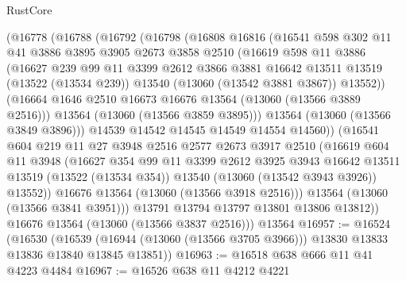 \begin{lexlean}{RustCore}
\begin{coremodule}
        (@16778
          (@16788
            (@16792
              (@16798
                (@16808
                  @16816
                  (@16541
                    @598
                    @302
                    @11
                    @41
                    @3886
                    @3895
                    @3905
                    @2673
                    @3858
                    @2510
                    (@16619
                      @598
                      @11
                      @3886
                      (@16627
                        @239
                        @99
                        @11
                        @3399
                        @2612
                        @3866
                        @3881
                        @16642
                        @13511
                        @13519
                        (@13522 (@13534 @239))
                        @13540
                        (@13060 (@13542 @3881 @3867))
                        @13552))
                    (@16664 @1646 @2510 @16673 @16676 @13564 (@13060 (@13566 @3889 @2516)))
                    @13564
                    (@13060 (@13566 @3859 @3895)))
                  @13564
                  (@13060 (@13566 @3849 @3896)))
                @14539
                @14542
                @14545
                @14549
                @14554
                @14560))
            (@16541
              @604
              @219
              @11
              @27
              @3948
              @2516
              @2577
              @2673
              @3917
              @2510
              (@16619
                @604
                @11
                @3948
                (@16627
                  @354
                  @99
                  @11
                  @3399
                  @2612
                  @3925
                  @3943
                  @16642
                  @13511
                  @13519
                  (@13522 (@13534 @354))
                  @13540
                  (@13060 (@13542 @3943 @3926))
                  @13552))
              @16676
              @13564
              (@13060 (@13566 @3918 @2516)))
            @13564
            (@13060 (@13566 @3841 @3951)))
          @13791
          @13794
          @13797
          @13801
          @13806
          @13812))
      @16676
      @13564
      (@13060 (@13566 @3837 @2516)))
    @13564
@16957 := @16524
    (@16530
      (@16539 (@16944 (@13060 (@13566 @3705 @3966))) @13830 @13833 @13836 @13840 @13845 @13851))
@16963 := @16518 @638 @666 @11 @41 @4223 @4484
@16967 := @16526 @638 @11 @4212 @4221

\end{coremodule}
\end{lexlean}
